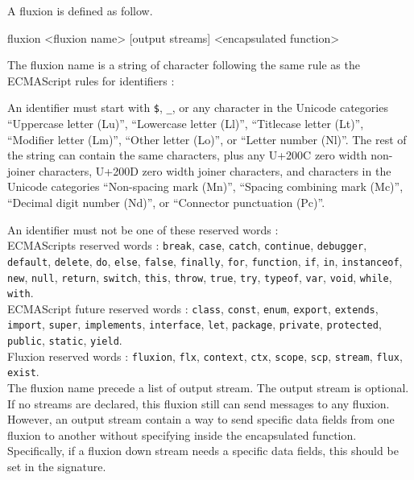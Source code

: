 A fluxion is defined as follow.

\begin{code}
fluxion <fluxion name> [output streams]
  <encapsulated function>
\end{code}

The fluxion name is a string of character following the same rule as the ECMAScript rules for identifiers :

An identifier must start with \texttt{\$}, \texttt{\_}, or any character in the Unicode categories “Uppercase letter (Lu)”, “Lowercase letter (Ll)”, “Titlecase letter (Lt)”, “Modifier letter (Lm)”, “Other letter (Lo)”, or “Letter number (Nl)”.
The rest of the string can contain the same characters, plus any U+200C zero width non-joiner characters, U+200D zero width joiner characters, and characters in the Unicode categories “Non-spacing mark (Mn)”, “Spacing combining mark (Mc)”, “Decimal digit number (Nd)”, or “Connector punctuation (Pc)”.

An identifier must not be one of these reserved words : \\
ECMAScripts reserved words : \texttt{break}, \texttt{case}, \texttt{catch}, \texttt{continue}, \texttt{debugger}, \texttt{default}, \texttt{delete}, \texttt{do}, \texttt{else}, \texttt{false}, \texttt{finally}, \texttt{for}, \texttt{function}, \texttt{if}, \texttt{in}, \texttt{instanceof}, \texttt{new}, \texttt{null}, \texttt{return}, \texttt{switch}, \texttt{this}, \texttt{throw}, \texttt{true}, \texttt{try}, \texttt{typeof}, \texttt{var}, \texttt{void}, \texttt{while}, \texttt{with}. \\
ECMAScript future reserved words : \texttt{class}, \texttt{const}, \texttt{enum}, \texttt{export}, \texttt{extends}, \texttt{import}, \texttt{super}, \texttt{implements}, \texttt{interface}, \texttt{let}, \texttt{package}, \texttt{private}, \texttt{protected}, \texttt{public}, \texttt{static}, \texttt{yield}.\\
Fluxion reserved words : \texttt{fluxion}, \texttt{flx}, \texttt{context}, \texttt{ctx}, \texttt{scope}, \texttt{scp}, \texttt{stream}, \texttt{flux}, \texttt{exist}. \\

The fluxion name precede a list of output stream.
The output stream is optional. If no streams are declared, this fluxion still can send messages to any fluxion.
However, an output stream contain a way to send specific data fields from one fluxion to another without specifying inside the encapsulated function.
Specifically, if a fluxion down stream needs a specific data fields, this should be set in the signature.

